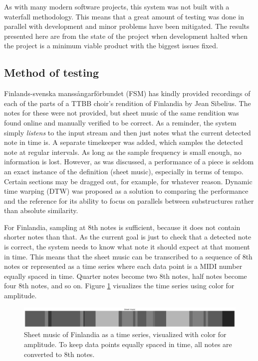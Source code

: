 As with many modern software projects, this system was not built with a waterfall methodology. This means that a great amount of testing was done in parallel with development and minor problems have been mitigated. The results presented here are from the state of the project when development halted when the project is a minimum viable product with the biggest issues fixed.

\subsection{Method of testing}
Finlands-svenska manssångarförbundet (FSM) has kindly provided recordings of each of the parts of a TTBB choir's rendition of Finlandia by Jean Sibelius. The notes for these were not provided, but sheet music of the same rendition was found online and manually verified to be correct. As a reminder, the system simply \textit{listens} to the input stream and then just notes what the current detected note in time is. A separate timekeeper was added, which samples the detected note at regular intervals. As long as the sample frequency is small enough, no information is lost. However, as was discussed, a performance of a piece is seldom an exact instance of the definition (sheet music), especially in terms of tempo. Certain sections may be dragged out, for example, for whatever reason. Dynamic time warping (DTW) was proposed as a solution to comparing the performance and the reference for its ability to focus on parallels between substructures rather than absolute similarity.

For Finlandia, sampling at 8th notes is sufficient, because it does not contain shorter notes than that. As the current goal is just to check that a detected note is correct, the system needs to know what note it should expect at that moment in time. This means that the sheet music can be transcribed to a sequence of 8th notes or represented as a time series where each data point is a MIDI number equally spaced in time. Quarter notes become two 8th notes, half notes become four 8th notes, and so on. Figure \ref{fig:sheetEncoding} visualizes the time series using color for amplitude.

\begin{figure}[ht]
    \centering
    \includegraphics[width=\textwidth]{./images/sheetEncoding.png}
    \caption{Sheet music of Finlandia as a time series, visualized with color for amplitude. To keep data points equally spaced in time, all notes are converted to 8th notes. \label{fig:sheetEncoding}}
\end{figure}

